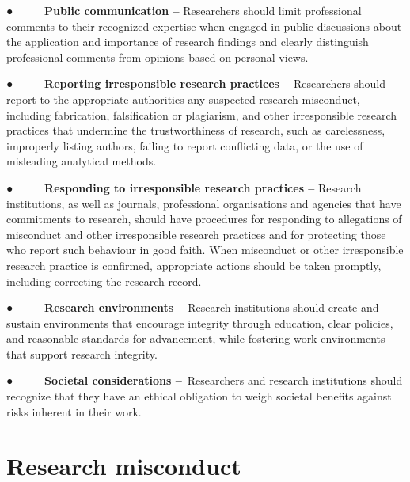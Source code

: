 \documentclass[
]{book}
\begin{document}
● ~ ~ ~ \textbf{Public communication --} Researchers should limit professional comments to their recognized expertise when engaged in public discussions about the application and importance of research findings and clearly distinguish professional comments from opinions based on personal views.

● ~ ~ ~ \textbf{Reporting irresponsible research practices --} Researchers should report to the appropriate authorities any suspected research misconduct, including fabrication, falsification or plagiarism, and other irresponsible research practices that undermine the trustworthiness of research, such as carelessness, improperly listing authors, failing to report conflicting data, or the use of misleading analytical methods.

● ~ ~ ~ \textbf{Responding to irresponsible research practices --} Research institutions, as well as journals, professional organisations and agencies that have commitments to research, should have procedures for responding to allegations of misconduct and other irresponsible research practices and for protecting those who report such behaviour in good faith. When misconduct or other irresponsible research practice is confirmed, appropriate actions should be taken promptly, including correcting the research record.

● ~ ~ ~ \textbf{Research environments --} Research institutions should create and sustain environments that encourage integrity through education, clear policies, and reasonable standards for advancement, while fostering work environments that support research integrity.

● ~ ~ ~ \textbf{Societal considerations --}~Researchers and research institutions should recognize that they have an ethical obligation to weigh societal benefits against risks inherent in their work.

\hypertarget{research-misconduct}{%
\section{\texorpdfstring{\textbf{Research misconduct}}{Research misconduct}}\label{research-misconduct}}
\end{document}
